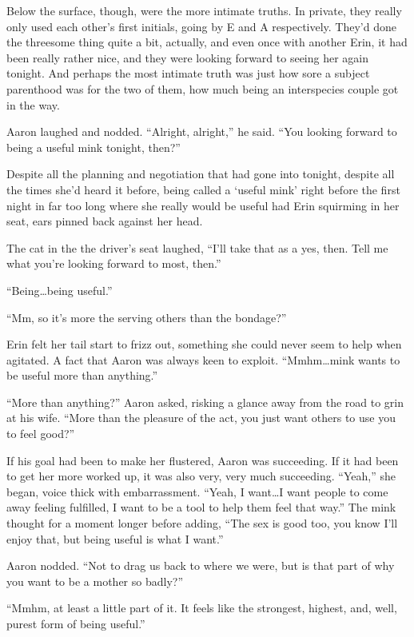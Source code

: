 Below the surface, though, were the more intimate truths. In private, they really only used each other's first initials, going by E and A respectively. They'd done the threesome thing quite a bit, actually, and even once with another Erin, it had been really rather nice, and they were looking forward to seeing her again tonight. And perhaps the most intimate truth was just how sore a subject parenthood was for the two of them, how much being an interspecies couple got in the way.

Aaron laughed and nodded. ``Alright, alright,'' he said. ``You looking forward to being a useful mink tonight, then?''

Despite all the planning and negotiation that had gone into tonight, despite all the times she'd heard it before, being called a `useful mink' right before the first night in far too long where she really would be useful had Erin squirming in her seat, ears pinned back against her head.

The cat in the the driver's seat laughed, ``I'll take that as a yes, then. Tell me what you're looking forward to most, then.''

``Being\ldots{}being useful.''

``Mm, so it's more the serving others than the bondage?''

Erin felt her tail start to frizz out, something she could never seem to help when agitated. A fact that Aaron was always keen to exploit. ``Mmhm\ldots{}mink wants to be useful more than anything.''

``More than anything?'' Aaron asked, risking a glance away from the road to grin at his wife. ``More than the pleasure of the act, you just want others to use you to feel good?''

If his goal had been to make her flustered, Aaron was succeeding. If it had been to get her more worked up, it was also very, very much succeeding. ``Yeah,'' she began, voice thick with embarrassment. ``Yeah, I want\ldots{}I want people to come away feeling fulfilled, I want to be a tool to help them feel that way.'' The mink thought for a moment longer before adding, ``The sex is good too, you know I'll enjoy that, but being useful is what I want.''

Aaron nodded. ``Not to drag us back to where we were, but is that part of why you want to be a mother so badly?''

``Mmhm, at least a little part of it. It feels like the strongest, highest, and, well, purest form of being useful.''

